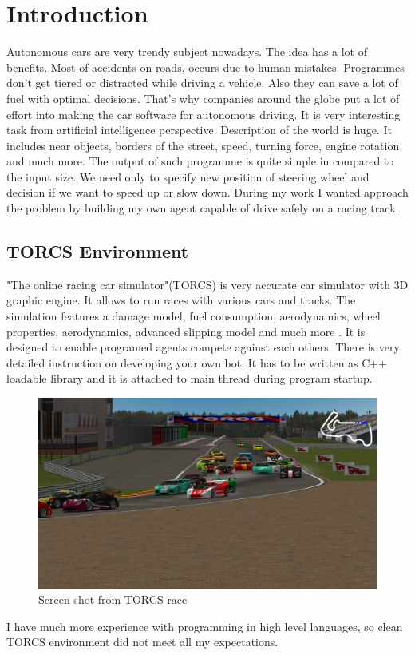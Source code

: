 \documentclass[declaration,shortabstract,english,inz]{iithesis}
\author         {Kacper Kulczak}
\begin{document}

\chapter{Introduction}

Autonomous cars are very trendy subject nowadays. The idea has a lot of benefits. Most of accidents on roads, occurs due to human mistakes. Programmes don't get tiered or distracted while driving a vehicle. Also they can save a lot of fuel with optimal decisions.
That's why companies around the globe put a lot of effort into making the car software for autonomous driving. It is very interesting task from artificial intelligence perspective. Description of the world is huge. It includes near objects, borders of the street, speed, turning force, engine rotation and much more. The output of such programme is quite simple in compared to the input size. We need only to specify new position of steering wheel and decision if we want to speed up or slow down. During my work I wanted approach the problem by building my own agent capable of drive safely on a racing track.




\section{TORCS Environment}
"The online racing car simulator"(TORCS) is very accurate car simulator with 3D graphic engine. It allows to run races with various cars and tracks. The simulation features a damage model, fuel consumption, aerodynamics, wheel properties, aerodynamics, advanced slipping model and much more \cite{TORCS}.  It is designed to enable programed agents compete against each others. There is very detailed instruction on developing your  own bot. It has to be written as C++ loadable library and it is attached to main thread during program startup.


\begin{figure}[h]
    \includegraphics[width=\linewidth]{img/torcs_look.jpeg}
    \caption{Screen shot from TORCS race \cite{TORCS}}
    \label{fig:torcs}
\end{figure}
I have much more experience with programming in high level languages, so clean TORCS environment did not meet all my expectations. 
\end{document}
